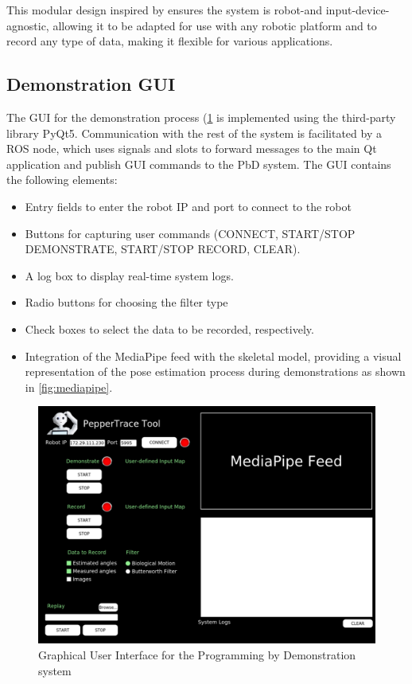 \documentclass{CSSRforAfrica}
\begin{document}
This modular design inspired by \cite{barros2024enhancing} ensures the system is robot-and input-device-agnostic, allowing it to be adapted for use with any robotic platform and to record any type of data, making it flexible for various applications. 

\subsection{Demonstration GUI}

The GUI for the demonstration process (\cref{fig:gui} is implemented using the third-party library PyQt5. Communication with the rest of the system is facilitated by a ROS node, which uses signals and slots \cite{qt_signals_slots} to forward messages to the main Qt application and publish GUI commands to the PbD system. The GUI contains the following elements: 

\begin{itemize}

    \item Entry fields to enter the robot IP and port to connect to the robot
    \item Buttons for capturing user commands (CONNECT, START/STOP DEMONSTRATE, START/STOP RECORD, CLEAR).
    \item A log box to display real-time system logs.
    \item Radio buttons for choosing the filter type 
    \item Check boxes to select the data to be recorded, respectively.
    \item Integration of the MediaPipe feed with the skeletal model, providing a visual representation of the pose estimation process during demonstrations as shown in \cref{fig:mediapipe}.

\end{itemize}


\begin{figure}[ht!]
    \centering
    \includegraphics[width=13cm]{figures/peppertrace_gui.png}
    \captionsetup{width=13cm}
    \caption{Graphical User Interface for the Programming by Demonstration system}
    \label{fig:gui}
\end{figure}
\end{document}
